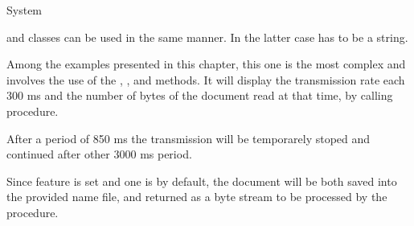 \documentclass{ozdoc}
\begin{document}
\begin{mozartCODEDISPLAY}
{\mozartSPACE{}\mozartSPACE{}\mozartSPACE{}\mozartLBRACE{}System}\mozartFACEKEYWORD{\mozartHASH{}}\mozartFACETEXT{\mozartNEWLINE
}\end{mozartCODEDISPLAY}




 and  classes can be used in the same manner. In the latter case  has to be a string. \mozartEMPTY





Among the examples presented in this chapter, this one is the most complex and involves the use of the , ,  and  methods. It will display the transmission rate each 300 ms and the number of bytes of the document read at that time, by calling  procedure. 

After a period of 850 ms the transmission will be temporarely stoped and continued after other 3000 ms period. 

Since  feature is set  and  one is  by default, the document will be both saved into the provided name  file, and returned as a byte stream to be processed by the  procedure. \mozartEMPTY
 \mozartEMPTY
 

\end{document}
